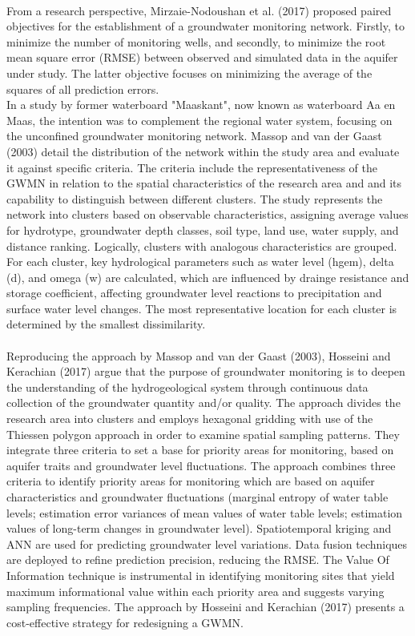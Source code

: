 \\
From a research perspective, Mirzaie-Nodoushan et al. (2017) proposed paired objectives for the establishment of a groundwater monitoring network. Firstly, to minimize the number of monitoring wells, and secondly, to minimize the root mean square error (RMSE) between observed and simulated data in the aquifer under study. The latter objective focuses on minimizing the average of the squares of all prediction errors. \\
In a study by former waterboard "Maaskant", now known as waterboard Aa en Maas, the intention was to complement the regional water system, focusing on the unconfined groundwater monitoring network. Massop and van der Gaast (2003) detail the distribution of the network within the study area and evaluate it against specific criteria. The criteria include the representativeness of the GWMN in relation to the spatial characteristics of the research area and and its capability to distinguish between different clusters. The study represents the network into clusters based on observable characteristics, assigning average values for hydrotype, groundwater depth classes, soil type, land use, water supply, and distance ranking. Logically, clusters with analogous characteristics are grouped. For each cluster, key hydrological parameters such as water level (hgem), delta (d), and omega (w) are calculated, which are influenced by drainge resistance and storage coefficient, affecting groundwater level reactions to precipitation and surface water level changes. The most representative location for each cluster is determined by the smallest dissimilarity. \\
\\
Reproducing the approach by Massop and van der Gaast (2003), Hosseini and Kerachian (2017) argue that the purpose of groundwater monitoring is to deepen the understanding of the hydrogeological system through continuous data collection of the groundwater quantity and/or quality. The approach divides the research area into clusters and employs hexagonal gridding with use of the Thiessen polygon approach in order to examine spatial sampling patterns. They integrate three criteria to set a base for priority areas for monitoring, based on aquifer traits and groundwater level fluctuations. The approach combines three criteria to identify priority areas for monitoring which are based on aquifer characteristics and groundwater fluctuations (marginal entropy of water table levels; estimation error variances of mean values of water table levels; estimation values of long-term changes in groundwater level). Spatiotemporal kriging and ANN are used for predicting groundwater level variations. Data fusion techniques are deployed to refine prediction precision, reducing the RMSE. The Value Of Information technique is instrumental in identifying monitoring sites that yield maximum informational value within each priority area and suggests varying sampling frequencies. The approach by Hosseini and Kerachian (2017) presents a cost-effective strategy for redesigning a GWMN. \\
